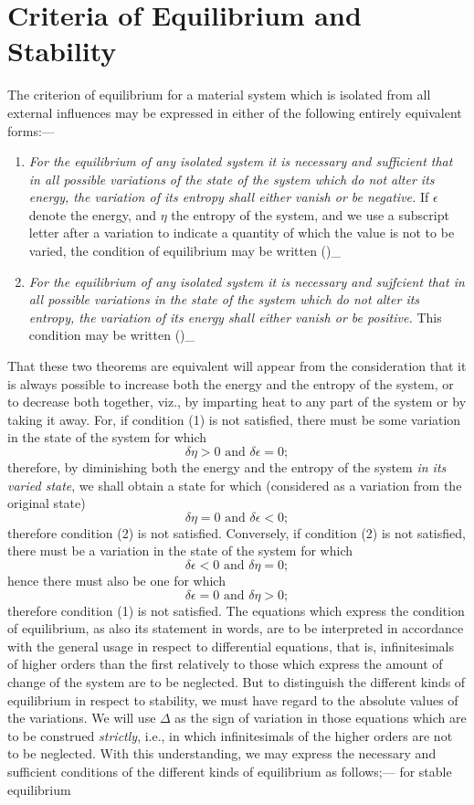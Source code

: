 \documentclass[12pt]{article}
\begin{document}
\section{Criteria of Equilibrium and Stability}
The criterion of equilibrium for a material system which is isolated from all external influences may be expressed in either of the following entirely equivalent forms:---
\begin{enumerate}
\item \textit{For the equilibrium of any isolated system it is necessary and sufficient that in all possible variations of the state of the system which do not alter its energy, the variation of its entropy shall either vanish or be negative.} If $\epsilon$ denote the energy, and $\eta$ the entropy of the system, and we use a subscript letter after a variation to indicate a quantity of which the value is not to be varied, the condition of equilibrium may be written
\eqs
 (\delta \eta)_{\epsilon}   \label{1}                     
\eqe
\item \textit{For the equilibrium of any isolated system it is necessary and sujfcient that in all possible variations in the state of the system which do not alter its entropy, the variation of its energy shall either vanish or be positive.}  This condition may be written
\eqs
(\delta \epsilon)_\eta {} \label{2}
\eqe                   
\end{enumerate}
That these two theorems are equivalent will appear from the consideration that it is always possible to increase both the energy and the entropy of the system, or to decrease both together, viz., by imparting heat to any part of the system or by taking it away. For, if condition (1) is not satisfied, there must be some variation in the state of the system for which
$$\delta \eta > 0 \text{  and }  \delta \epsilon = 0;$$
therefore, by diminishing both the energy and the entropy of the system \textit{in its varied state}, we shall obtain a state for which (considered as a variation from the original state)
$$\delta \eta = 0 \text{  and }  \delta \epsilon <0;$$
therefore condition (2) is not satisfied. Conversely, if condition (2) is not satisfied, there must be a variation in the state of the system for which
$$\delta \epsilon < 0 \text{  and }  \delta \eta =0;$$
hence there must also be one for which
$$\delta \epsilon = 0 \text{  and }  \delta \eta >0;$$
therefore condition (1) is not satisfied.
The equations which express the condition of equilibrium, as also its statement in words, are to be interpreted in accordance with the general usage in respect to differential equations, that is, infinitesimals of higher orders than the first relatively to those which express the amount of change of the system are to be neglected. But to distinguish the different kinds of equilibrium in respect to stability, we must have regard to the absolute values of the variations. We will use $\Delta$ as the sign of variation in those equations which are to be construed \emph{strictly}, i.e., in which infinitesimals of the higher orders are not to be neglected. With this understanding, we may express the necessary and sufficient conditions of the different kinds of equilibrium as follows;--- for stable equilibrium
\end{document}
